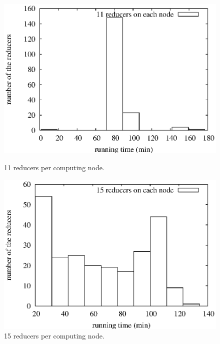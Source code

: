 \begin{figure}[htbp]
\hfill
\begin{minipage}[t]{0.45\linewidth}
\begin{center}
\centerline{\includegraphics[scale=0.33]{plots/miami-11reducers-dist.eps}}
\caption{11 reducers per computing node.}
\label{fig:11reducers-dist}
\end{center}
\end{minipage}
\hfill
\begin{minipage}[t]{0.45\linewidth}
\begin{center}
\centerline{\includegraphics[scale=0.33]{plots/miami-15reducers-dist.eps}}
\caption{15 reducers per computing node.}
\label{fig:15reducers-dist}
\end{center}
\end{minipage}
\hfill
\end{figure}

